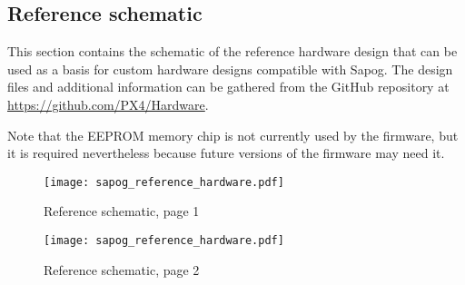 \documentclass{zubaxdoc}
\begin{document}
\subsection{Reference schematic}

This section contains the schematic of the reference hardware design that can be used as a basis for custom hardware
designs compatible with Sapog.
The design files and additional information can be gathered from the GitHub repository at
\url{https://github.com/PX4/Hardware}.

Note that the EEPROM memory chip is not currently used by the firmware,
but it is required nevertheless because future versions of the firmware may need it.

\begin{figure}[hbt]
    \centering
    \texttt{[image: sapog\_reference\_hardware.pdf]}
    \caption{Reference schematic, page 1}
\end{figure}

\begin{figure}[hbt]
    \centering
    \texttt{[image: sapog\_reference\_hardware.pdf]}
    \caption{Reference schematic, page 2}
\end{figure}
\end{document}
